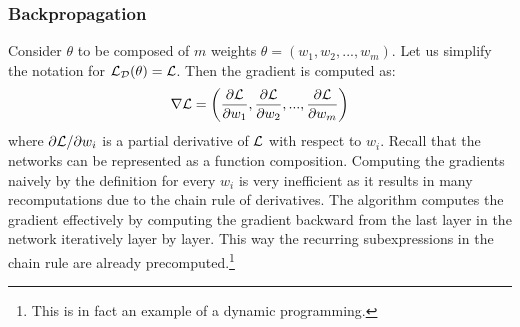    \subsubsection{Backpropagation}
    Consider $\theta$ to be composed of $m$ weights $\theta = (w_1, w_2, ..., w_m)$.
    Let us simplify the notation for $\mathcal{L}_\mathcal{D}(\theta) = \mathcal{L}$. Then the
    gradient is computed as:
    $$
        \grad = \left(\pd{1}, \pd{2}, ..., \pd{m}\right)
    $$
    where $\partial \mathcal{L} / \partial w_i$ is a partial derivative of $\mathcal{L}$ with
    respect to $w_i$. Recall that the networks can be represented as a function
    composition. Computing the gradients naively by the definition for every $w_i$
    is very inefficient as it results in many recomputations due to the chain rule
    of derivatives. The  algorithm \cite{backprop} computes the
    gradient effectively by computing the gradient backward from the last layer in
    the network iteratively layer by layer. This way the recurring subexpressions in
    the chain rule are already precomputed.\footnote{This is in fact an example of a
        dynamic programming.}




